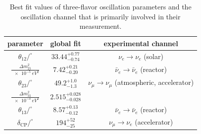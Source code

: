 \begin{table}
\caption{Best fit values of three-flavor oscillation parameters and the oscillation channel that is primarily involved in their measurement.\label{tab:global-bfp}}
\begin{tabular}{ccc}\toprule
    parameter & global fit & experimental channel \\ \midrule
    $\theta_{12}/^\circ$                    & $33.44^{+0.77}_{-0.74}$   & $\nu_e \rightarrow \nu_e$ (solar)\\
    $\frac{\Delta m^2_{21}}{\SI{e-5}{eV^2}}$& $7.42^{+0.21}_{-0.20}$    & $\bar{\nu}_e \rightarrow \bar{\nu}_e$ (reactor)\\
    $\theta_{23}/^\circ$                    & $49.2^{+1.0}_{-1.3} $     & $\nu_\mu \rightarrow \nu_\mu$  (atmospheric, accelerator)\\
    $\frac{\Delta m^2_{31}}{\SI{e-3}{eV^2}}$& $2.515^{+0.028}_{-0.028}$ & \\
    $\theta_{13}/^\circ$                    & $8.57^{+0.13}_{-0.12} $   & $\bar{\nu}_e \rightarrow \bar{\nu}_e$ (reactor)\\
    $\delta_\mathrm{CP}/^\circ$             & $194^{+52}_{-25}$         & $\nu_\mu \rightarrow \nu_e$ (accelerator)\\ \bottomrule
\end{tabular}
\end{table}

